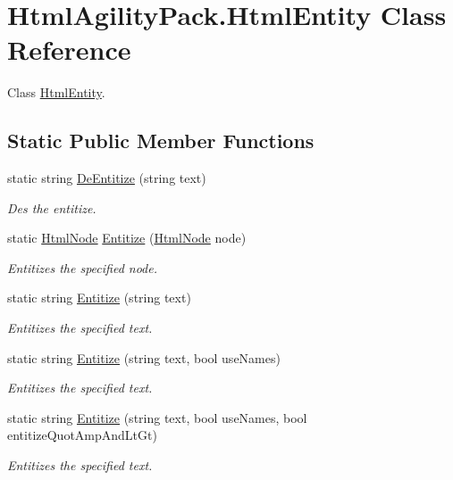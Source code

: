 \hypertarget{class_html_agility_pack_1_1_html_entity}{}\section{Html\+Agility\+Pack.\+Html\+Entity Class Reference}
\label{class_html_agility_pack_1_1_html_entity}


Class \hyperlink{class_html_agility_pack_1_1_html_entity}{Html\+Entity}.  


\subsection*{Static Public Member Functions}
\begin{DoxyCompactItemize}
\item 
static string \hyperlink{class_html_agility_pack_1_1_html_entity_a0eff30150e69a7c8097125ee108a0a49}{De\+Entitize} (string text)
\begin{DoxyCompactList}\small\item\em Des the entitize. \end{DoxyCompactList}\item 
static \hyperlink{class_html_agility_pack_1_1_html_node}{Html\+Node} \hyperlink{class_html_agility_pack_1_1_html_entity_ae752bfdce1a048ebfe9bc9a515a7c637}{Entitize} (\hyperlink{class_html_agility_pack_1_1_html_node}{Html\+Node} node)
\begin{DoxyCompactList}\small\item\em Entitizes the specified node. \end{DoxyCompactList}\item 
static string \hyperlink{class_html_agility_pack_1_1_html_entity_ada97762ae6193f45090e133b08d7def4}{Entitize} (string text)
\begin{DoxyCompactList}\small\item\em Entitizes the specified text. \end{DoxyCompactList}\item 
static string \hyperlink{class_html_agility_pack_1_1_html_entity_a82d69919761ce06894ea5891a043ee99}{Entitize} (string text, bool use\+Names)
\begin{DoxyCompactList}\small\item\em Entitizes the specified text. \end{DoxyCompactList}\item 
static string \hyperlink{class_html_agility_pack_1_1_html_entity_a9f2705a754944fb7454590094c38efb1}{Entitize} (string text, bool use\+Names, bool entitize\+Quot\+Amp\+And\+Lt\+Gt)
\begin{DoxyCompactList}\small\item\em Entitizes the specified text. \end{DoxyCompactList}\end{DoxyCompactItemize}
